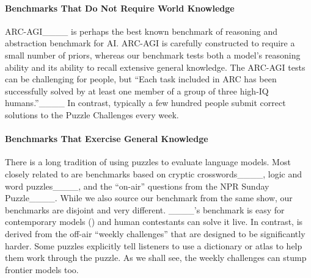\paragraph{Benchmarks That Do Not Require World Knowledge}
ARC-AGI____ is perhaps the best known benchmark of reasoning and abstraction benchmark for AI. ARC-AGI is carefully constructed to require a small number of priors, whereas our benchmark 
tests both a model's reasoning ability and its ability to recall extensive general knowledge. The ARC-AGI tests can be challenging for people, but
``Each task included in ARC has been successfully solved by at least one member of a group of three high-IQ humans.''____ In contrast, typically a few hundred people submit correct solutions to the Puzzle Challenges every week.


\paragraph{Benchmarks That Exercise General Knowledge}

There is a long tradition of using puzzles to evaluate language models. Most closely related to \benchmark{} are benchmarks based on cryptic crosswords____, logic and word puzzles____, and the ``on-air'' questions from the NPR Sunday Puzzle____. While we also source our benchmark from the same show, our benchmarks are disjoint and very different. ____'s benchmark is  easy for contemporary models () and human contestants can solve it live.  In contrast, \benchmark{} is derived from the off-air ``weekly challenges'' that are designed to be significantly harder. Some puzzles explicitly tell listeners to use a dictionary or atlas to help them work through the puzzle. As we shall see, the weekly challenges can stump frontier models too.